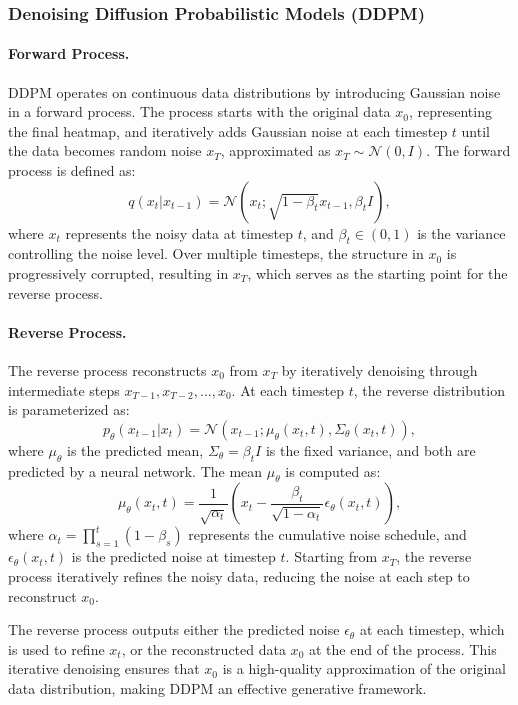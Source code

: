 \subsubsection{Denoising Diffusion Probabilistic Models (DDPM)}

\paragraph{Forward Process.}  
DDPM \cite{ho2020ddpm} operates on continuous data distributions by introducing Gaussian noise in a forward process. The process starts with the original data \(x_0\), representing the final heatmap, and iteratively adds Gaussian noise at each timestep \(t\) until the data becomes random noise \(x_T\), approximated as \(x_T \sim \mathcal{N}(0, I)\). The forward process is defined as:
\[
q(x_t | x_{t-1}) = \mathcal{N}(x_t; \sqrt{1 - \beta_t} x_{t-1}, \beta_t I),
\]
where \(x_t\) represents the noisy data at timestep \(t\), and \(\beta_t \in (0, 1)\) is the variance controlling the noise level. Over multiple timesteps, the structure in \(x_0\) is progressively corrupted, resulting in \(x_T\), which serves as the starting point for the reverse process.

\paragraph{Reverse Process.}  
The reverse process reconstructs \(x_0\) from \(x_T\) by iteratively denoising through intermediate steps \(x_{T-1}, x_{T-2}, \dots, x_0\). At each timestep \(t\), the reverse distribution is parameterized as:
\[
p_\theta(x_{t-1} | x_t) = \mathcal{N}(x_{t-1}; \mu_\theta(x_t, t), \Sigma_\theta(x_t, t)),
\]
where \(\mu_\theta\) is the predicted mean, \(\Sigma_\theta = \beta_t I\) is the fixed variance, and both are predicted by a neural network. The mean \(\mu_\theta\) is computed as:
\[
\mu_\theta(x_t, t) = \frac{1}{\sqrt{\alpha_t}} \left( x_t - \frac{\beta_t}{\sqrt{1 - \alpha_t}} \epsilon_\theta(x_t, t) \right),
\]
where \(\alpha_t = \prod_{s=1}^t (1 - \beta_s)\) represents the cumulative noise schedule, and \(\epsilon_\theta(x_t, t)\) is the predicted noise at timestep \(t\). Starting from \(x_T\), the reverse process iteratively refines the noisy data, reducing the noise at each step to reconstruct \(x_0\).

The reverse process outputs either the predicted noise \(\epsilon_\theta\) at each timestep, which is used to refine \(x_t\), or the reconstructed data \(x_0\) at the end of the process. This iterative denoising ensures that \(x_0\) is a high-quality approximation of the original data distribution, making DDPM an effective generative framework.


